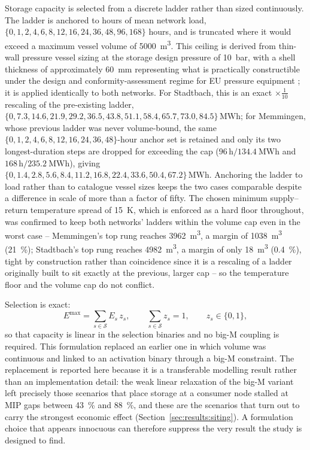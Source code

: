 \documentclass[review,3p]{elsarticle}
\begin{document}
Storage capacity is selected from a discrete ladder rather than sized
continuously. The ladder is anchored to hours of mean network load,
$\{0, 1, 2, 4, 6, 8, 12, 16, 24, 36, 48, 96, 168\}$ hours, and is
truncated where it would exceed a maximum vessel volume of
\SI{5000}{\cubic\metre}. This ceiling is derived from thin-wall pressure
vessel sizing at the storage design pressure of \SI{10}{\bar}, with a
shell thickness of approximately \SI{60}{\milli\metre} representing what
is practically constructible under the design and conformity-assessment
regime for EU pressure equipment \cite{PED.2014}; it is applied
identically to both
networks. For Stadtbach, this is an exact $\times\frac{1}{10}$ rescaling
of the pre-existing ladder,
$\{0, 7.3, 14.6, 21.9, 29.2, 36.5, 43.8, 51.1, 58.4, 65.7, 73.0,
84.5\}\,\si{\mega\watt\hour}$; for Memmingen, whose previous ladder was
never volume-bound, the same $\{0,1,2,4,6,8,12,16,24,36,48\}$-hour
anchor set is retained and only its two longest-duration steps are
dropped for exceeding the cap ($96\,\mathrm{h}/\SI{134.4}{\mega\watt
\hour}$ and $168\,\mathrm{h}/\SI{235.2}{\mega\watt\hour}$), giving
$\{0, 1.4, 2.8, 5.6, 8.4, 11.2, 16.8, 22.4, 33.6, 50.4,
67.2\}\,\si{\mega\watt\hour}$. Anchoring the ladder to load rather than to
catalogue vessel sizes keeps the two cases comparable despite a
difference in scale of more than a factor of fifty. The chosen minimum
supply--return temperature spread of \SI{15}{\kelvin}, which is enforced
as a hard floor throughout, was confirmed to keep both networks' ladders
within the volume cap even in the worst case
-- Memmingen's top rung reaches \SI{3962}{\cubic\metre}, a margin of
\SI{1038}{\cubic\metre} (\SI{21}{\percent}); Stadtbach's top rung
reaches \SI{4982}{\cubic\metre}, a margin of only \SI{18}{\cubic\metre}
(\SI{0.4}{\percent}), tight by construction rather than coincidence
since it is a rescaling of a ladder originally built to sit exactly at
the previous, larger cap -- so the temperature floor and the volume cap do
not conflict.

Selection is exact:
\begin{equation}
\label{eq:tesladder}
E^{\max} = \sum_{s \in \mathcal{S}} E_s\, z_s,
\qquad \sum_{s \in \mathcal{S}} z_s = 1,
\qquad z_s \in \{0,1\},
\end{equation}
so that capacity is linear in the selection binaries and no big-M
coupling is required. This formulation replaced an earlier one in which
volume was continuous and linked to an activation binary through a big-M
constraint. The replacement is reported here because it is a
transferable modelling result rather than an implementation detail: the
weak linear relaxation of the big-M variant left precisely those
scenarios that place storage at a consumer node stalled at MIP gaps
between \SI{43}{\percent} and \SI{88}{\percent}, and these are the
scenarios that turn out to carry the strongest economic effect
(Section~\ref{sec:results:siting}). A formulation choice that appears
innocuous can therefore suppress the very result the study is designed
to find.
\end{document}
